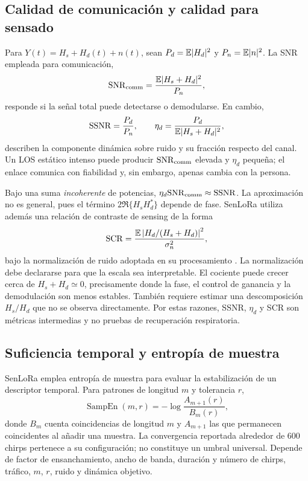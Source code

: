 \subsection{Calidad de comunicación y calidad para sensado}

Para $Y(t)=H_s+H_d(t)+n(t)$, sean
$P_d=\mathbb{E}|H_d|^2$ y $P_n=\mathbb{E}|n|^2$. La SNR empleada para comunicación,
\begin{equation}
\mathrm{SNR}_{\rm comm}
=\frac{\mathbb{E}|H_s+H_d|^2}{P_n},
\end{equation}
responde si la señal total puede detectarse o demodularse. En cambio,
\begin{equation}
\mathrm{SSNR}=\frac{P_d}{P_n},\qquad
\eta_d=\frac{P_d}{\mathbb{E}|H_s+H_d|^2},
\label{eq:ssnr_dynamic_fraction}
\end{equation}
describen la componente dinámica sobre ruido y su fracción respecto del canal.
Un LOS estático intenso puede producir $\mathrm{SNR}_{\rm comm}$ elevada y
$\eta_d$ pequeña; el enlace comunica con fiabilidad y, sin embargo, apenas cambia
con la persona.

Bajo una suma \emph{incoherente} de potencias,
$\eta_d\mathrm{SNR}_{\rm comm}\approx\mathrm{SSNR}$. La aproximación no es general,
pues el término $2\Re\{H_sH_d^*\}$ depende de fase. SenLoRa utiliza además una
relación de contraste de sensing de la forma
\begin{equation}
\mathrm{SCR}=
\frac{\mathbb{E}\left|H_d/(H_s+H_d)\right|^2}{\sigma_n^2},
\label{eq:senlora_scr}
\end{equation}
bajo la normalización de ruido adoptada en su procesamiento \citep{SenLoRa2025}.
La normalización debe declararse para que la escala sea interpretable. El cociente
puede crecer cerca de $H_s+H_d\simeq0$, precisamente donde la fase, el control de
ganancia y la demodulación son menos estables. También requiere estimar una
descomposición $H_s/H_d$ que no se observa directamente. Por estas razones, SSNR,
$\eta_d$ y SCR son métricas intermedias y no pruebas de recuperación respiratoria.

\subsection{Suficiencia temporal y entropía de muestra}

SenLoRa emplea entropía de muestra para evaluar la estabilización de un descriptor
temporal. Para patrones de longitud $m$ y tolerancia $r$,
\begin{equation}
\operatorname{SampEn}(m,r)=
-\log\frac{A_{m+1}(r)}{B_m(r)},
\label{eq:sample_entropy}
\end{equation}
donde $B_m$ cuenta coincidencias de longitud $m$ y $A_{m+1}$ las que permanecen
coincidentes al añadir una muestra. La convergencia reportada alrededor de 600
chirps pertenece a su configuración; no constituye un umbral universal. Depende
de factor de ensanchamiento, ancho de banda, duración y número de chirps, tráfico,
$m$, $r$, ruido y dinámica objetivo.

